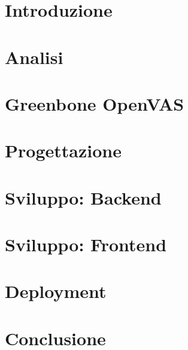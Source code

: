 \documentclass[draft]{book}
\begin{document}
  
  \tableofcontents
  \listoffigures
  \chapter{Introduzione}
  
  \chapter{Analisi}
  
  \chapter{Greenbone OpenVAS}
  
  \chapter{Progettazione}
  
  \chapter{Sviluppo: Backend}
  
  \chapter{Sviluppo: Frontend}
  
  \chapter{Deployment}
  
  \chapter{Conclusione}
  

  \printbibliography
\end{document}
